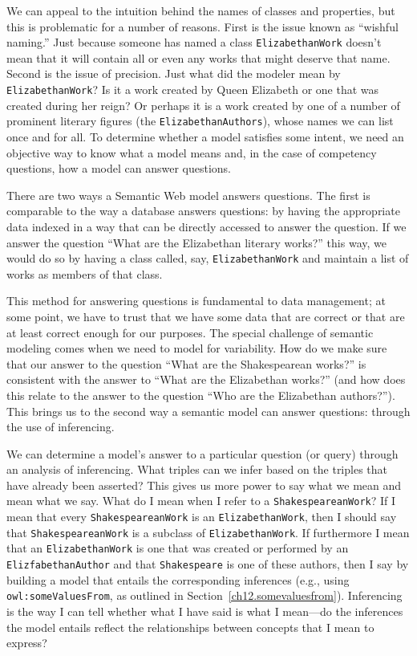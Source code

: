 We can appeal to the intuition behind the names of classes and
properties, but this is problematic for a number of reasons. First is
the issue known as ``wishful naming.'' Just because someone has named a
class \texttt{ElizabethanWork} doesn't mean that it will contain all or even any
works that might deserve that name. Second is the issue of precision.
Just what did the modeler mean by \texttt{ElizabethanWork}? Is it a work created
by Queen Elizabeth or one that was created during her reign? Or perhaps
it is a work created by one of a number of prominent literary figures
(the \texttt{ElizabethanAuthors}), whose names we can list once and for all. To
determine whether a model satisfies some intent, we need an objective
way to know what a model means and, in the case of competency questions,
how a model can answer questions.

There are two ways a Semantic Web model answers questions. The first is
comparable to the way a database answers questions: by having the
appropriate data indexed in a way that can be directly accessed to
answer the question. If we answer the question ``What are the
Elizabethan literary works?'' this way, we would do so by having a class
called, say, \texttt{ElizabethanWork} and maintain a list of works as members of
that class.

This method for answering questions is fundamental to data management;
at some point, we have to trust that we have some data that are correct
or that are at least correct enough for our purposes. The special
challenge of semantic modeling comes when we need to model for
variability. How do we make sure that our answer to the question ``What
are the Shakespearean works?'' is consistent with the answer to ``What
are the Elizabethan works?'' (and how does this relate to the answer to
the question ``Who are the Elizabethan authors?''). This brings us to
the second way a semantic model can answer questions: through the use of
inferencing.

We can determine a model's answer to a particular question (or query)
through an analysis of inferencing. What triples can we infer based on
the triples that have already been asserted? This gives us more power to
say what we mean and mean what we say. What do I mean when I refer to a
\texttt{ShakespeareanWork}? If I mean that every \texttt{ShakespeareanWork} is an
\texttt{ElizabethanWork}, then I should say that \texttt{ShakespeareanWork} is a subclass
of \texttt{ElizabethanWork}. If furthermore I mean that an \texttt{ElizabethanWork} is one
that was created or performed by an \texttt{ElizfabethanAuthor} and that
\texttt{Shakespeare} is one of these authors, then I say by building a model that
entails the corresponding inferences (e.g., using \texttt{owl:someValuesFrom}, as 
outlined in Section~\ref{ch12.somevaluesfrom}).
Inferencing is the way I can tell whether what I have said is what I
mean---do the inferences the model entails reflect the relationships
between concepts that I mean to express?

